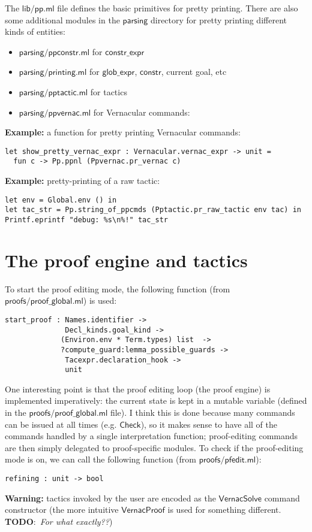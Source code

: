 \documentclass[a4paper,oneside]{book}
\newcommand{\m}[1]{\ensuremath{\mathsf{#1}}}
\newcommand{\TODO}[1]{\textbf{TODO}:\ \emph{#1}}
\begin{document}
The \m{lib/pp.ml} file defines the basic primitives for pretty
printing. There are also some additional modules in the \m{parsing}
directory for pretty printing different kinds of entities:

\begin{itemize}
\item \m{parsing/ppconstr.ml} for \m{constr\_expr}
\item \m{parsing/printing.ml} for \m{glob\_expr}, \m{constr}, current
  goal, etc
\item \m{parsing/pptactic.ml} for tactics
\item \m{parsing/ppvernac.ml} for Vernacular commands:
\end{itemize}

\noindent
\textbf{Example:} a function for pretty printing Vernacular commands:

\begin{lstlisting}
let show_pretty_vernac_expr : Vernacular.vernac_expr -> unit = 
  fun c -> Pp.ppnl (Ppvernac.pr_vernac c)
\end{lstlisting}

\noindent
\textbf{Example:} pretty-printing of a raw tactic:

\begin{lstlisting}
let env = Global.env () in
let tac_str = Pp.string_of_ppcmds (Pptactic.pr_raw_tactic env tac) in
Printf.eprintf "debug: %s\n%!" tac_str
\end{lstlisting}

\section{The proof engine and tactics}

To start the proof editing mode, the following function (from
\m{proofs/proof\_global.ml}) is used:
\begin{lstlisting}
start_proof : Names.identifier -> 
              Decl_kinds.goal_kind ->
             (Environ.env * Term.types) list  ->
             ?compute_guard:lemma_possible_guards -> 
              Tacexpr.declaration_hook -> 
              unit
\end{lstlisting}

One interesting point is that the proof editing loop (the proof
engine) is implemented imperatively: the current state is kept in a
mutable variable (defined in the \m{proofs/proof\_global.ml} file). I
think this is done because many commands can be issued at all times
(e.g. \m{Check}), so it makes sense to have all of the commands
handled by a single interpretation function; proof-editing commands
are then simply delegated to proof-specific modules. To check if the
proof-editing mode is on, we can call the following function (from
\m{proofs/pfedit.ml}):
\begin{lstlisting}
refining : unit -> bool
\end{lstlisting}
\textbf{Warning:} tactics invoked by the user are encoded as
the \m{VernacSolve} command constructor (the more intuitive
\m{VernacProof} is used for something different. \TODO{For what
  exactly??})
\end{document}
